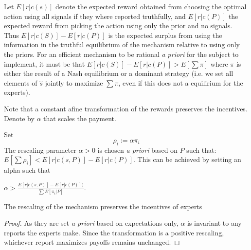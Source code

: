 Let $E[r|c(s)]$ denote the expected reward obtained from choosing the optimal action using all signals if they where reported truthfully, and $E[r|c(P)] $ the expected reward from picking the action using only the prior and no signals. Thus $E[r|c(S)] - E[r|c(P)] $ is the expected surplus from using the information in the truthful equilibrium of the mechanism relative to using only the priors. For an efficient mechanism to be rational \emph{a priori} for the subject to implement, it must be that $E[r|c(S)] - E[r|c(P)] > E[\sum \pi]$ where $\pi$ is either the result of a Nash equilibrium or a dominant strategy (i.e. we set all elements of $\hat{s}$ jointly to maximize $\sum \pi$, even if this does not a equilirium for the experts).

Note that a constant afine transformation of the rewards preserves the incentives. Denote by $\alpha$ that scales the payment.

\begin{mech}
Set
\[
  \rho_i  := \alpha \pi_i
\]
The rescaling parameter $\alpha>0$ is chosen \emph{a priori} based on $P$ such that: $ E[\sum \rho_i] < E[r|c(s,P)] - E[r|c(P)] $. This can be achieved by setting an alpha such that

 $\alpha >   \frac{E[r|c(s,P)] - E[r|c(P)] )}{\sum E[\pi_i|P] }  $. 

\end{mech}



\begin{lem}
	The rescaling of the mechanism preserves the incentives of experts
\end{lem}

\begin{proof}
	As they are set \emph{a priori} based on expectations only, $\alpha$ is invariant to any reports the experts make. Since the transformation is a positive rescaling, whichever report maximizes payoffs remains unchanged. 
\end{proof}


